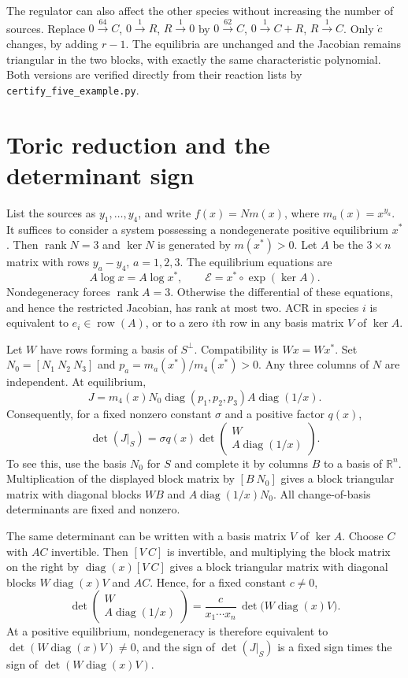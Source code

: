 \documentclass[11pt,a4paper]{report}
\providecommand{\R}{\mathbb R}
\providecommand{\rank}{\operatorname{rank}}
\providecommand{\diag}{\operatorname{diag}}
\begin{document}
The regulator can also affect the other species without increasing the number of sources. Replace
$0\xrightarrow{64}C$, $0\xrightarrow1 R$, $R\xrightarrow1 0$ by
$0\xrightarrow{62}C$, $0\xrightarrow1 C+R$, $R\xrightarrow1 C$.
Only $\dot c$ changes, by adding $r-1$. The equilibria are unchanged and the Jacobian remains
triangular in the two blocks, with exactly the same characteristic polynomial. Both versions are
verified directly from their reaction lists by \texttt{certify\_five\_example.py}.

\section{Toric reduction and the determinant sign}
List the sources as $y_1,\ldots,y_4$, and write $f(x)=N m(x)$, where $m_a(x)=x^{y_a}$.
It suffices to consider a system possessing a nondegenerate positive equilibrium $x^*$.
Then $\rank N=3$ and $\ker N$ is generated by $m(x^*)>0$.
Let $A$ be the $3\times n$ matrix with rows $y_a-y_4$, $a=1,2,3$.
The equilibrium equations are
\[
 A\log x=A\log x^*,\qquad
 \mathcal E=x^*\circ\exp(\ker A).
\]
Nondegeneracy forces $\rank A=3$. Otherwise the differential of these equations, and hence
the restricted Jacobian, has rank at most two. ACR in species $i$ is equivalent to
$e_i\in\operatorname{row}(A)$, or to a zero $i$th row in any basis matrix $V$ of $\ker A$.

Let $W$ have rows forming a basis of $S^\perp$. Compatibility is $Wx=Wx^*$.
Set $N_0=[N_1\ N_2\ N_3]$ and $p_a=m_a(x^*)/m_4(x^*)>0$.
Any three columns of $N$ are independent. At equilibrium,
\[
 J=m_4(x)N_0\diag(p_1,p_2,p_3)A\diag(1/x).
\]
Consequently, for a fixed nonzero constant $\sigma$ and a positive factor $q(x)$,
\begin{equation}\label{eq:orientation}
 \det(J|_S)=\sigma q(x)
 \det\begin{pmatrix}W\\ A\diag(1/x)\end{pmatrix}.
\end{equation}
To see this, use the basis $N_0$ for $S$ and complete it by columns $B$ to a basis of $\R^n$.
Multiplication of the displayed block matrix by $[B\ N_0]$ gives a block triangular matrix with
diagonal blocks $WB$ and $A\diag(1/x)N_0$. All change-of-basis determinants are fixed and nonzero.

The same determinant can be written with a basis matrix $V$ of $\ker A$. Choose $C$ with $AC$ invertible.
Then $[V\ C]$ is invertible, and multiplying the block matrix on the right by $\diag(x)[V\ C]$ gives a block
triangular matrix with diagonal blocks $W\diag(x)V$ and $AC$. Hence, for a fixed constant $c\ne0$,
\begin{equation}\label{eq:orientationV}
 \det\begin{pmatrix}W\\ A\diag(1/x)\end{pmatrix}
 =\frac{c}{x_1\cdots x_n}\,\det\bigl(W\diag(x)V\bigr).
\end{equation}
At a positive equilibrium, nondegeneracy is therefore equivalent to $\det(W\diag(x)V)\ne0$, and the sign
of $\det(J|_S)$ is a fixed sign times the sign of $\det(W\diag(x)V)$.
\end{document}
